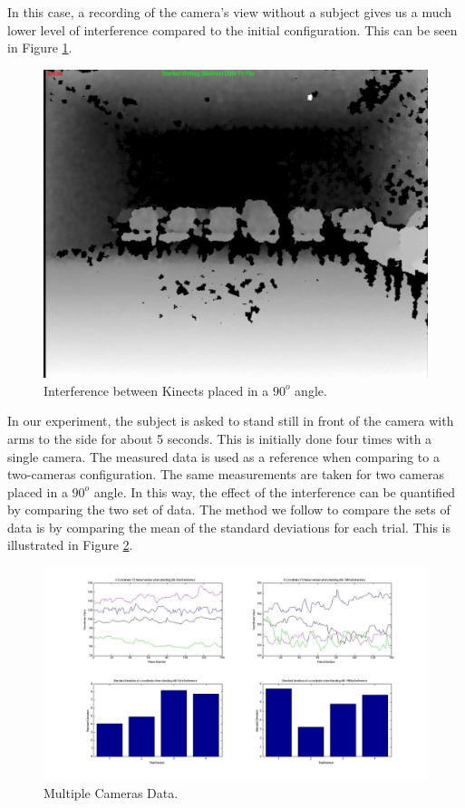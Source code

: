 \documentclass[a4paper]{article}
\begin{document}
In this case, a recording of the camera's view without a subject gives us a much lower level of interference compared to the initial configuration. This can be seen in Figure \ref{IR_interference_90}.

\begin{figure}[H]
\centering
\includegraphics[scale=0.2]{IR_Interference90deg.jpg}
\caption{Interference between Kinects placed in a $90^o$ angle.}
\label{IR_interference_90}
\end{figure}
 
In our experiment, the subject is asked to stand still in front of the camera with arms to the side for about 5 seconds. This is initially done four times with a single camera. The measured data is used as a reference when comparing to a two-cameras configuration. The same measurements are taken for two cameras placed in a $90^o$ angle. In this way, the effect of the interference can be quantified by comparing the two set of data. The method we follow to compare the sets of data is by comparing the mean of the standard deviations for each trial. This is illustrated in Figure \ref{Multiple_Std}. 
 
\begin{figure}[H]
\centering
\includegraphics[scale=0.3]{Multiple_Cameras_Std.jpg}
\caption{Multiple Cameras Data.} %
\label{Multiple_Std}
\end{figure}
\end{document}
